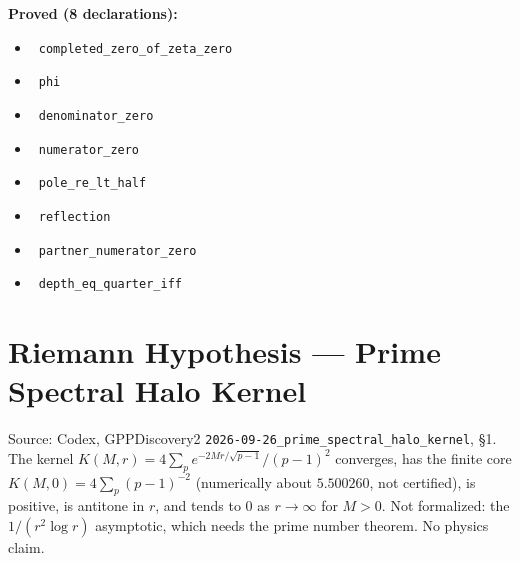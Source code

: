 \documentclass{report}
\theoremstyle{definition}
\begin{document}
\noindent\textbf{Proved (8 declarations):}
\begin{itemize}
  \item {}\leanok\ \texttt{completed\_zero\_of\_zeta\_zero}
  \item {}\leanok\ \texttt{phi}
  \item {}\leanok\ \texttt{denominator\_zero}
  \item {}\leanok\ \texttt{numerator\_zero}
  \item {}\leanok\ \texttt{pole\_re\_lt\_half}
  \item {}\leanok\ \texttt{reflection}
  \item {}\leanok\ \texttt{partner\_numerator\_zero}
  \item {}\leanok\ \texttt{depth\_eq\_quarter\_iff}
\end{itemize}

\section{Riemann Hypothesis --- Prime Spectral Halo Kernel}
Source: Codex, GPPDiscovery2 \texttt{2026-09-26\_prime\_spectral\_halo\_kernel}, \S1. The kernel $K(M,r)=4\sum_p e^{-2Mr/\sqrt{p-1}}/(p-1)^2$ converges, has the finite core $K(M,0)=4\sum_p (p-1)^{-2}$ (numerically about $5.500260$, not certified), is positive, is antitone in $r$, and tends to $0$ as $r\to\infty$ for $M>0$. Not formalized: the $1/(r^2\log r)$ asymptotic, which needs the prime number theorem. No physics claim.
\end{document}
